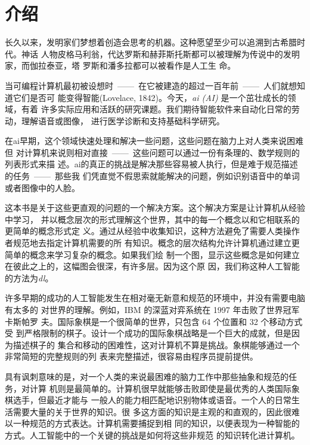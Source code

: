 
\chapter{介绍}
\label{ch:intro}

长久以来，发明家们梦想着创造会思考的机器。这种愿望至少可以追溯到古希腊时代。神话
人物皮格马利翁，代达罗斯和赫菲斯托斯都可以被理解为传说中的发明家，而伽拉泰亚，塔
罗斯和潘多拉都可以被看作是人工生
命\citep{ovid2004metamorphoses,sparkes1996red,1997works}。

当可编程计算机最初被设想时~——~在它被建造的超过一百年前~——~人们就想知道它们是否可
能变得智能(Lovelace, 1842)。今天，\emph{\gls{ai} (AI)} 是一个茁壮成长的领域，有着
许多实际应用和活跃的研究课题。我们期待智能软件来自动化日常的劳动，理解语音或图像，
进行医学诊断和支持基础科学研究。

在\gls*{ai}早期，这个领域快速处理和解决一些问题，这些问题在脑力上对人类来说困难但
对计算机来说则相对直接~——~这些问题可以通过一份有条理的、数学规则的列表形式来描
述。\gls*{ai}的真正的挑战是解决那些容易被人执行，但是难于规范描述的任务~——~那些我
们凭直觉不假思索就能解决的问题，例如识别语音中的单词或者图像中的人脸。

这本书是关于这些更直观的问题的一个解决方案。这个解决方案是让计算机从经验中学习，
并以概念层次的形式理解这个世界，其中的每一个概念以和它相联系的更简单的概念形式定
义。通过从经验中收集知识，这种方法避免了需要人类操作者规范地去指定计算机需要的所
有知识。概念的层次结构允许计算机通过建立更简单的概念来学习复杂的概念。如果我们绘
制一个图，显示这些概念是如何建立在彼此之上的，这幅图会很深，有许多层。因为这个原
因，我们称这种人工智能的方法为\emph{\gls{dl}}。

许多早期的成功的人工智能发生在相对毫无新意和规范的环境中，并没有需要电脑有太多的
对世界的理解。例如，IBM 的深蓝对弈系统在 1997 年击败了世界冠军卡斯帕罗
夫\citep{Hsu2002}。国际象棋是一个很简单的世界，只包含 64 个位置和 32 个移动方式受
到严格限制的棋子。设计一个成功的国际象棋战略是一个巨大的成就，但是因为描述棋子的
集合和移动的困难性，这对计算机不算是挑战。象棋能够通过一个非常简短的完整规则的列
表来完整描述，很容易由程序员提前提供。

具有讽刺意味的是，对一个人类的来说最困难的脑力工作中那些抽象和规范的任务，对计算
机则是最简单的。计算机很早就能够击败即使是最优秀的人类国际象棋选手，但最近才能与
一般人的能力相匹配地识别物体或语音。一个人的日常生活需要大量的关于世界的知识。很
多这方面的知识是主观的和直观的，因此很难以一种规范的方式表达。计算机需要捕捉到相
同的知识，以便表现为一种智能的方式。人工智能中的一个关键的挑战是如何将这些非规范
的知识转化进计算机。

